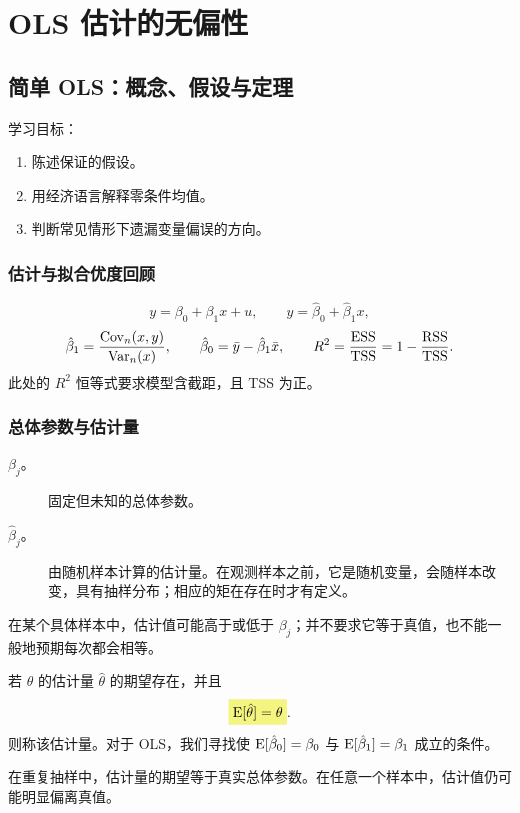 \chapter{OLS 估计的无偏性}
\label{ch:week4}
\section{简单 OLS：概念、假设与定理}
\label{sec:unbiasedness-concept}
学习目标：
\begin{enumerate}
\item 陈述保证的假设。
\item 用经济语言解释零条件均值。
\item 判断常见情形下遗漏变量偏误的方向。
\end{enumerate}
\subsection{估计与拟合优度回顾}
\[y=\beta_0+\beta_1x+u,\qquad
\hat y=\hat\beta_0+\hat\beta_1x,\]
\[\hat\beta_1=\frac{\operatorname{Cov}_n(x,y)}{\operatorname{Var}_n(x)},\qquad
\hat\beta_0=\bar y-\hat\beta_1\bar x,\qquad
R^2=\frac{\operatorname{ESS}}{\operatorname{TSS}}=1-\frac{\operatorname{RSS}}{\operatorname{TSS}}.\]
此处的 $R^2$ 恒等式要求模型含截距，且 TSS 为正。

\subsection{总体参数与估计量}
\begin{description}
\item[$\beta_j$。]固定但未知的总体参数。
\item[$\hat\beta_j$。]由随机样本计算的估计量。在观测样本之前，它是随机变量，会随样本改变，具有抽样分布；相应的矩在存在时才有定义。
\end{description}
在某个具体样本中，估计值可能高于或低于 $\beta_j$；并不要求它等于真值，也不能一般地预期每次都会相等。

\begin{definition}[无偏估计量]
若 $\theta$ 的估计量 $\hat\theta$ 的期望存在，并且
\[\hm{\E[\hat\theta]=\theta}.\]
则称该估计量。对于 OLS，我们寻找使 $\operatorname{E}[\hat\beta_0]=\beta_0$ 与 $\operatorname{E}[\hat\beta_1]=\beta_1$ 成立的条件。
\end{definition}
在重复抽样中，估计量的期望等于真实总体参数。在任意一个样本中，估计值仍可能明显偏离真值。

